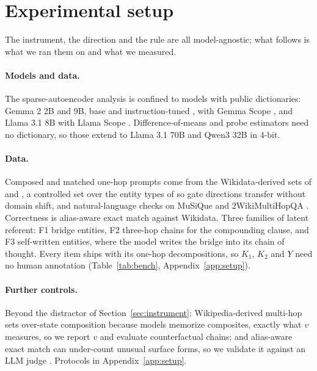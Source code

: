 \documentclass{article}
\begin{document}
\section{Experimental setup}

The instrument, the direction and the rule are all model-agnostic; what follows is what we ran them
on and what we measured.

\paragraph{Models and data.} The sparse-autoencoder analysis is confined to models with public
dictionaries: Gemma 2 2B and 9B, base and instruction-tuned \citep{gemma2024}, with Gemma Scope
\citep{lieberum2024gemmascope}, and Llama 3.1 8B \citep{dubey2024llama} with Llama Scope
\citep{he2024llamascope}. Difference-of-means and probe estimators need no dictionary, so those extend
to Llama 3.1 70B and Qwen3 32B \citep{qwen3} in 4-bit.

\paragraph{Data.}
Composed and matched one-hop prompts come from the Wikidata-derived sets of \citet{yang2024latent}
and \citet{biran2024hopping}, a controlled set over the entity types of \citet{ferrando2025entity} so
gate directions transfer without domain shift, and natural-language checks on MuSiQue
\citep{trivedi2022musique} and 2WikiMultiHopQA \citep{ho2020constructing}. Correctness is alias-aware
exact match against Wikidata. Three families of latent referent: F1 bridge entities, F2 three-hop chains
for the compounding clause, and F3 self-written entities, where the model writes the bridge into its
chain of thought. Every item ships with its one-hop decompositions, so $K_1$, $K_2$ and $Y$ need no
human annotation (Table~\ref{tab:bench}, Appendix~\ref{app:setup}).

\paragraph{Further controls.} Beyond the distractor of Section~\ref{sec:instrument}: Wikipedia-derived
multi-hop sets over-state composition because models memorize composites, exactly what $v$ measures,
so we report $v$ and evaluate counterfactual chains; and alias-aware exact match can under-count
unusual surface forms, so we validate it against an {LLM} judge \citep{zheng2023judge}. Protocols in
Appendix~\ref{app:setup}.
\end{document}
